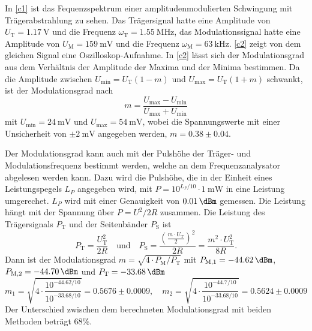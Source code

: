 In \autoref{c1} ist das Fequenzspektrum einer amplitudenmodulierten Schwingung mit Trägerabstrahlung zu sehen. Das Trägersignal hatte eine Amplitude von $U_\text{T}=\SI{1.17}{\volt}$ und die Frequenz $\omega_\text{T}=\SI{1.55}{\mega\hertz}$, das Modulationssignal hatte eine Amplitude von $U_\text{M}=\SI{159}{\milli\volt}$ und die Frequenz $\omega_\text{M}=\SI{63}{\kilo\hertz}$. \autoref{c2} zeigt von dem gleichen Signal eine Oszilloskop-Aufnahme. In \autoref{c2} lässt sich der Modulationsgrad aus dem Verhältnis der Amplitude der Maxima und der Minima bestimmen. Da die Amplitude zwischen $U_\text{min} = U_\text{T}(1 - m)$ und $U_\text{max} = U_\text{T}(1 + m)$ schwankt, ist der Modulationsgrad nach
\[
	m = \frac{U_\text{max} - U_\text{min}}{U_\text{max} + U_\text{min}}
\]
mit $U_\text{min} = \SI{24}{\milli\volt}$ und $U_\text{max} = \SI{54}{\milli\volt}$, wobei die Spannungswerte mit einer Unsicherheit von $\pm \SI{2}{\milli\volt}$ angegeben werden, $m = 0.38 \pm 0.04$.\par
\indent Der Modulationsgrad kann auch mit der Pulshöhe der Träger- und Modulationsfrequenz bestimmt werden, welche an dem Frequenzanalysator abgelesen werden kann. Dazu wird die Pulshöhe, die in der Einheit eines Leistungspegels $L_P$ angegeben wird, mit $P = 10^{L_P/10} \cdot \SI{1}{\milli\watt}$ in eine Leistung umgerechet. $L_P$ wird mit einer Genauigkeit von $\SI{0.01}{\dBm}$ gemessen. Die Leistung hängt mit der Spannung über $P = U^2/2R$ zusammen. Die Leistung des Trägersignals $P_\text{T}$ und der Seitenbänder $P_\text{S}$ ist
\[
P_\text{T} = \frac{U_\text{T}^2}{2R} \quad \text{und} \quad P_\text{S} = \frac{\left(\frac{m \cdot U_\text{T}}{2}\right)^2}{2R} = \frac{m^2 \cdot {U_\text{T}^2}}{8R}.
\]
Dann ist der Modulationsgrad $m = \sqrt{4 \cdot P_\text{M}/P_\text{T}}$ mit $P_\text{M,1} = \SI{-44.62}{\dBm}$, $P_\text{M,2} = \SI{-44.70}{\dBm}$ und $P_\text{T} = \SI{-33.68}{\dBm}$
\[
	m_1 = \sqrt{4 \cdot \frac{10^{-44.62/10}}{10^{-33.68/10}}} = 0.5676 \pm 0.0009, \quad m_2 = \sqrt{4 \cdot \frac{10^{-44.7/10}}{10^{-33.68/10}}} = 0.5624 \pm 0.0009
\]
Der Unterschied zwischen dem berechneten Modulationsgrad mit beiden Methoden beträgt 68\%.

